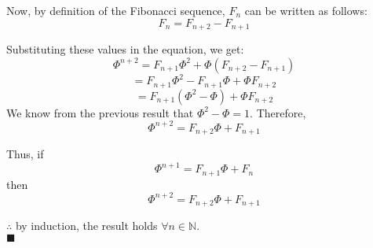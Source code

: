 \documentclass[a4paper,12pt]{article} %
\begin{document}
\begin{enumerate}
\begin{enumerate}
\begin{enumerate}
            Now, by definition of the Fibonacci sequence, $F_{n}$ can be written as follows:
            $$ F_{n} = F_{n+2} - F_{n + 1}$$

            Substituting these values in the equation, we get:
            $$\Phi^{n+2} = F_{n+1}\Phi^2 + \Phi(F_{n+2} - F_{n+1})$$
            $$ = F_{n+1}\Phi^2 - F_{n+1}\Phi + \Phi F_{n+2} $$
            $$ = F_{n+1}(\Phi^2 - \Phi) + \Phi F_{n+2}$$
            We know from the previous result that $\Phi^2 - \Phi = 1$. Therefore,
            $$\Phi^{n+2} = F_{n+2}\Phi + F_{n+1}$$

            Thus, if
              $$\Phi^{n+1} = F_{n+1}\Phi + F_{n}$$
            then
              $$\Phi^{n+2} = F_{n+2}\Phi + F_{n+1}$$

            $\therefore$ by induction, the result holds $\forall n \in \mathbb{N}$.\\
            $\blacksquare$
        \end{enumerate}
    \end{enumerate}
\end{enumerate}
\end{document}
